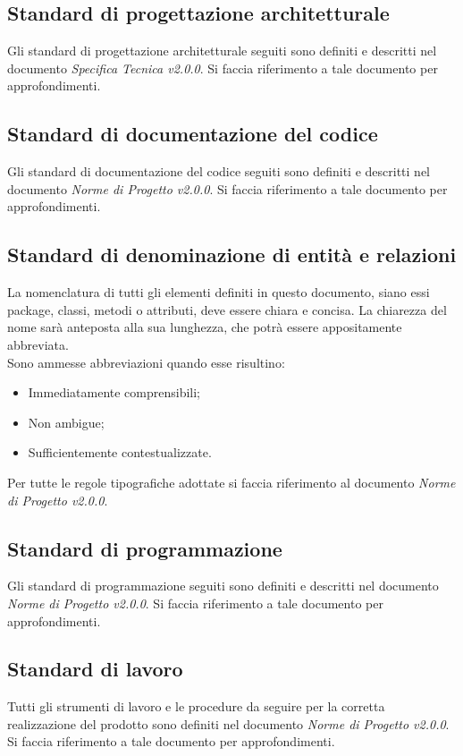 \subsection{Standard di progettazione architetturale}
Gli standard di progettazione architetturale seguiti sono definiti e descritti nel documento \textit{Specifica Tecnica v2.0.0}. Si faccia riferimento a tale
documento per approfondimenti.
\subsection{Standard di documentazione del codice}
Gli standard di documentazione del codice seguiti sono definiti e descritti nel documento \textit{Norme di Progetto v2.0.0}. Si faccia riferimento a tale
documento per approfondimenti.
\subsection{Standard di denominazione di entità e relazioni}
La nomenclatura di tutti gli elementi definiti in questo documento, siano essi package, classi, metodi o attributi, deve essere chiara e concisa. 
La chiarezza del nome sarà anteposta alla sua lunghezza, che potrà essere appositamente abbreviata. \\
\noindent Sono ammesse abbreviazioni quando esse risultino:
\begin{itemize}
 \item Immediatamente comprensibili;
 \item Non ambigue;
 \item Sufficientemente contestualizzate.
\end{itemize}
Per tutte le regole tipografiche adottate si faccia riferimento al documento \textit{Norme di Progetto v2.0.0}.

\subsection{Standard di programmazione}
Gli standard di programmazione seguiti sono definiti e descritti nel documento \textit{Norme di Progetto v2.0.0}. Si faccia riferimento a tale
documento per approfondimenti.
\subsection{Standard di lavoro}
Tutti gli strumenti di lavoro e le procedure da seguire per la corretta realizzazione del prodotto sono definiti nel documento \textit{Norme di Progetto v2.0.0}.
Si faccia riferimento a tale documento per approfondimenti.



